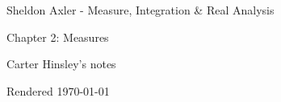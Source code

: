 \documentclass[a4paper]{article}
\begin{document}
\begin{center}
\LARGE{Sheldon Axler - Measure, Integration \& Real Analysis}

\Large{Chapter 2: Measures}

\large{Carter Hinsley's notes}

Rendered \today
\end{center}
\end{document}
